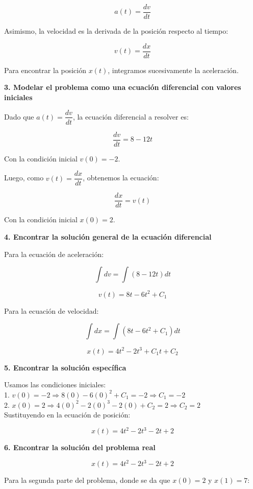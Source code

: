 \documentclass[answers]{exam}
\begin{document}
\[
	a(t) = \frac{dv}{dt}
\]

Asimismo, la velocidad es la derivada de la posición respecto al tiempo:

\[
	v(t) = \frac{dx}{dt}
\]

Para encontrar la posición \( x(t) \), integramos sucesivamente la aceleración.

\vspace{0.3cm}
\textbf{3. Modelar el problema como una ecuación diferencial con valores iniciales}

Dado que \( a(t) = \dfrac{dv}{dt} \), la ecuación diferencial a resolver es:

\[
	\frac{dv}{dt} = 8 - 12t
\]

Con la condición inicial \( v(0) = -2 \).

Luego, como \( v(t) = \dfrac{dx}{dt} \), obtenemos la ecuación:

\[
	\frac{dx}{dt} = v(t)
\]

Con la condición inicial \( x(0) = 2 \).

\vspace{0.3cm}
\textbf{4. Encontrar la solución general de la ecuación diferencial}

Para la ecuación de aceleración:

\[
	\int dv = \int (8 - 12t) dt
\]

\[
	v(t) = 8t - 6t^2 + C_1
\]

Para la ecuación de velocidad:

\[
	\int dx = \int (8t - 6t^2 + C_1) dt
\]

\[
	x(t) = 4t^2 - 2t^3 + C_1 t + C_2
\]

\newpage
\textbf{5. Encontrar la solución específica}

Usamos las condiciones iniciales:\\

1. \( v(0) = -2 \Rightarrow 8(0) - 6(0)^2 + C_1 = -2 \Rightarrow C_1 = -2 \)\\

2. \( x(0) = 2 \Rightarrow 4(0)^2 - 2(0)^3 -2(0) + C_2 = 2 \Rightarrow C_2 = 2 \)\\

Sustituyendo en la ecuación de posición:

\[
	x(t) = 4t^2 - 2t^3 - 2t + 2
\]


\textbf{6. Encontrar la solución del problema real}

\[
	x(t) = 4t^2 - 2t^3 - 2t + 2
\]

Para la segunda parte del problema, donde se da que \( x(0) = 2 \) y \( x(1) = 7 \):
\end{document}
